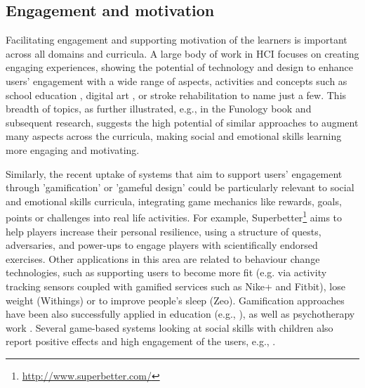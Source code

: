 \documentclass[prodmode,acmtochi]{acmsmall}
\newcommand{\todo}[1]{\textrm{\textrm{\textcolor{LightBlue}{[[#1]]} } } }
\newcommand{\GeraldineFIX}[1]{}
\begin{document}
\subsection{Engagement and motivation}

Facilitating engagement and supporting motivation of the learners is important across all domains and curricula. %
%
A large body of work in HCI focuses on creating engaging experiences, showing the potential of technology and design to enhance users' engagement with a wide range of aspects, activities and concepts such as school education \cite{Connolly2012,Bers2010}, digital art \cite{Edmonds2013}, or stroke rehabilitation \cite{Balaam2011a} to name just a few. This breadth of topics, as further illustrated, e.g., in the Funology book \cite{blythe2004funology} and subsequent research, suggests the high potential of similar approaches to augment many aspects across the curricula, making social and emotional skills learning more engaging and motivating.

Similarly, the recent uptake of systems that aim to support users' engagement through 'gamification' or 'gameful design' \cite{Deterding2011,McGonigal2011} \GeraldineFIX{G: have to be careful about who we claim as HCI eg don't imagine mcgonigal would label herself as hci  \\P: is this ok now? I don't think we are claiming it to be HCI ... the newly added 'similarly' maybe can help emphasise this?}could be particularly relevant to social and emotional skills curricula,  integrating game mechanics like rewards, goals, points or challenges into real life activities.  
%
For example, Superbetter\footnote{\url{http://www.superbetter.com/}} aims to help players increase their personal resilience, using a structure of quests, adversaries, and power-ups to engage players with scientifically endorsed exercises. Other applications in this area are related to behaviour change technologies, such as supporting users to become more fit (e.g. via activity tracking sensors coupled with gamified services such as Nike+ and Fitbit), lose weight  (Withings) or to improve people's sleep (Zeo). 
%
Gamification approaches have been also successfully applied in education (e.g., \cite{torres2011quest,Sheldon2011,Mamykina2008}), as well as psychotherapy work \cite{Goh2008,Piper2006}. %
Several game-based systems looking at social skills with children also report positive effects and high engagement of the users, e.g., \cite{Hourcade2013,Hendrix2009a}.
\end{document}
